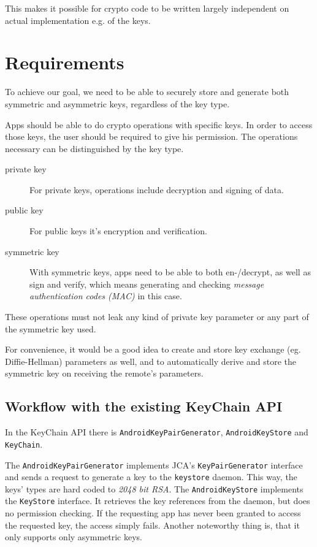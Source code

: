\documentclass[a4paper,draft]{scrartcl}
\begin{document}
		This makes it possible for crypto code to be written largely independent on actual implementation e.g. of the keys.

	\section{Requirements}
		To achieve our goal, we need to be able to securely store and generate both symmetric and asymmetric keys, regardless of the key type.

		Apps should be able to do crypto operations with specific keys. In order to access those keys, the user should be required to give his permission. The operations necessary can be distinguished by the key type.
		\begin{description}
			\item[private key] For private keys, operations include decryption and signing of data.
			\item[public key] For public keys it's encryption and verification.
			\item[symmetric key] With symmetric keys, apps need to be able to both en-/decrypt, as well as sign and verify, which means generating and checking {\em message authentication codes (MAC)} in this case.
		\end{description}

		These operations must not leak any kind of private key parameter or any part of the symmetric key used.

		For convenience, it would be a good idea to create and store key exchange (eg. Diffie-Hellman) parameters as well, and to automatically derive and store the symmetric key on receiving the remote's parameters. %

	\subsection{Workflow with the existing KeyChain API}
		In the KeyChain API there is \texttt{AndroidKeyPairGenerator}, \texttt{AndroidKeyStore} and 
		\texttt{KeyChain}.

		The \texttt{AndroidKeyPairGenerator} implements JCA's \texttt{KeyPairGenerator} interface and sends a request to generate a key to the \texttt{keystore} daemon. This way, the keys' types are hard coded to {\em 2048 bit RSA}. The \texttt{AndroidKeyStore} implements the \texttt{KeyStore} interface. It retrieves the key references from the daemon, but does no permission checking. If the requesting app has never been granted to access the requested key, the access simply fails. Another noteworthy thing is, that it only supports only asymmetric keys.
\end{document}
